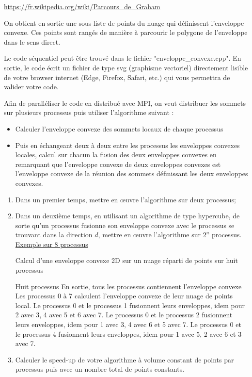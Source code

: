 \documentclass[fleqn,11pt]{article}
\begin{document}
\url{https://fr.wikipedia.org/wiki/Parcours_de_Graham}

On obtient en sortie une sous-liste de points du nuage qui définissent l'enveloppe convexe. Ces points sont rangés de manière à parcourir le polygone de l'enveloppe dans le sens direct.

Le code séquentiel peut être trouvé dans le fichier "enveloppe\_convexe.cpp".
En sortie, le code écrit un fichier de type svg (graphisme vectoriel) directement lisible de votre browser internet (Edge, Firefox, Safari, etc.) qui vous permettra de valider votre code.

Afin de paralléliser le code en distribué avec MPI, on veut distribuer les sommets sur plusieurs processus puis utiliser l'algorithme suivant :
\begin{itemize}
\item Calculer l'enveloppe convexe des sommets locaux de chaque processus
\item Puis en échangeant deux à deux entre les processus les enveloppes convexes locales, calcul sur chacun la fusion des deux enveloppes convexes en remarquant que l'enveloppe convexe de deux enveloppes convexes est l'enveloppe convexe de la réunion des sommets définissant les deux enveloppes convexes.
\end{itemize}

\begin{enumerate}
  \item Dans un premier temps, mettre en {\oe}uvre l'algorithme sur deux processus;
  \item Dans un deuxième temps, en utilisant un algorithme de type hypercube, de sorte qu'un processus
  fusionne son enveloppe convexe avec le processus se trouvant dans la direction $d$, mettre en {\oe}uvre l'algorithme
  sur $2^{n}$ processus.\\
  \underline{Exemple sur 8 processus}
\begin{algorithm}[H]
\caption{Calcul d'une enveloppe convexe 2D sur un nuage réparti de points sur huit processus}
\begin{algorithmic}
\REQUIRE Huit processus
\ENSURE En sortie, tous les processus contiennent l'enveloppe convexe
\STATE Les processus 0 à 7 calculent l'enveloppe convexe de leur nuage de points local.
\STATE Le processus 0 et le processus 1 fusionnent leurs enveloppes, idem pour 2 avec 3, 4 avec 5 et 6 avec 7.
\STATE Le processus 0 et le processus 2 fusionnent leurs enveloppes, idem pour 1 avec 3, 4 avec 6 et 5 avec 7.
\STATE Le processus 0 et le processus 4 fusionnent leurs enveloppes, idem pour 1 avec 5, 2 avec 6 et 3 avec 7. 
\end{algorithmic}
\end{algorithm}
\item Calculer le speed-up de votre algorithme à volume constant de points par processus puis avec un nombre total de points constants.
\end{enumerate}
\end{document}

